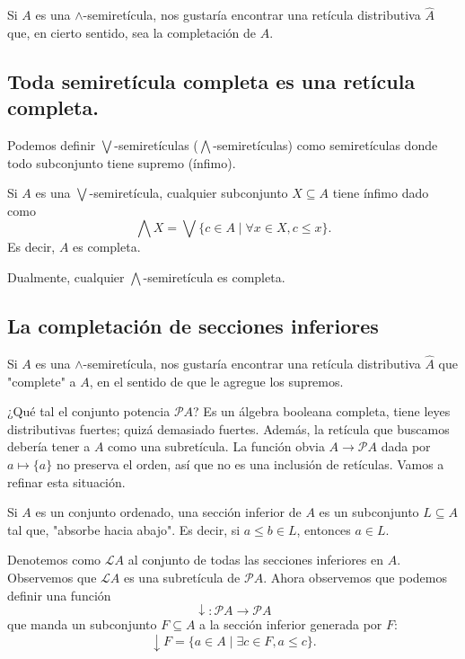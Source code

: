 \documentclass[12pt,letterpaper,titlepage]{article}
\theoremstyle{definition}
\newcommand\Sup{\bigvee}
\newcommand\down{{\downarrow}}
\renewcommand\inf{\wedge}
\newcommand\Inf{\bigwedge}
\renewcommand\cal[1]{\mathcal{#1}}
\newcommand\<{\langle}
\renewcommand\>{\rangle}
\begin{document}
Si $A$ es una $\inf$-semiretícula, nos gustaría encontrar una
retícula distributiva $\hat A$ que, en cierto sentido, sea la
completación de $A$.

\subsection{Toda semiretícula completa es una retícula completa.}
Podemos definir $\Sup$-semiretículas ($\Inf$-semiretículas) como
semiretículas donde todo subconjunto tiene supremo (ínfimo).

Si $A$ es una $\Sup$-semiretícula, cualquier subconjunto
$X\subseteq A$ tiene ínfimo dado como
\[
  \Inf X = \Sup\{c\in A \mid \forall x\in X, c\leq x\}
.\]
Es decir, $A$ es completa.

Dualmente, cualquier $\Inf$-semiretícula es completa.

\subsection{La completación de secciones inferiores}
Si $A$ es una $\inf$-semiretícula, nos gustaría encontrar una
retícula distributiva $\hat A$ que "complete" a $A$, en el
sentido de que le agregue los supremos.

¿Qué tal el conjunto potencia $\cal PA$?
Es un álgebra booleana completa, tiene leyes distributivas
fuertes; quizá demasiado fuertes.
Además, la retícula que buscamos debería tener a $A$ como una
subretícula.
La función obvia $A\to\cal PA$ dada por $a\mapsto\{a\}$
no preserva el orden, así que no es una inclusión de
retículas.
Vamos a refinar esta situación.

Si $A$ es un conjunto ordenado, una sección inferior de $A$
es un subconjunto $L\subseteq A$ tal que, "absorbe hacia abajo".
Es decir, si $a\leq b\in L$, entonces $a\in L$.

Denotemos como $\cal LA$ al conjunto de todas las secciones
inferiores en $A$.
Observemos que $\cal LA$ es una subretícula
de $\cal PA$.
Ahora observemos que podemos definir una función
\[
  \down:\cal PA\to\cal PA
\]
que manda un subconjunto $F\subseteq A$ a la sección inferior
generada por $F$:
\[
  \down F = \{a\in A \mid \exists c\in F , a\leq c\}
.\]
\end{document}
